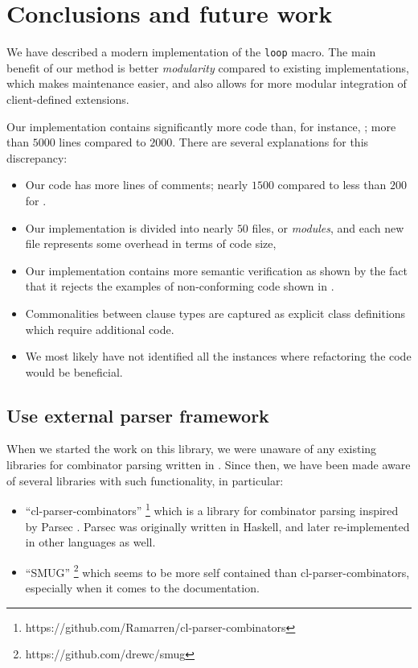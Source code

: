 \section{Conclusions and future work}

We have described a modern implementation of the \commonlisp{}
\texttt{loop} macro.  The main benefit of our method is better
\emph{modularity} compared to existing implementations, which makes
maintenance easier, and also allows for more modular integration of
client-defined extensions.

Our implementation contains significantly more code than, for
instance, \mitloop{}; more than $5000$ lines compared to $2000$.  There
are several explanations for this discrepancy:

\begin{itemize}
\item Our code has more lines of comments; nearly $1500$ compared to
  less than $200$ for \mitloop{}.
\item Our implementation is divided into nearly $50$ files, or
  \emph{modules}, and each new file represents some overhead in terms
  of code size,
\item Our implementation contains more semantic verification as shown
  by the fact that it rejects the examples of non-conforming code shown
  in .
\item Commonalities between clause types are captured as explicit
  class definitions which require additional code.
\item We most likely have not identified all the instances where
  refactoring the code would be beneficial.
\end{itemize}

\subsection{Use external parser framework}

When we started the work on this library, we were unaware of any
existing libraries for combinator parsing written in \commonlisp{}.
Since then, we have been made aware of several libraries with such
functionality, in particular:

\begin{itemize}
\item ``cl-parser-combinators''%
\footnote{https://github.com/Ramarren/cl-parser-combinators} which is
a library for combinator parsing inspired by Parsec
\cite{Leijen:Meijer:Parsec}.  Parsec was originally written in
Haskell, and later re-implemented in other languages as well.
\item ``SMUG''%
\footnote{https://github.com/drewc/smug} which seems to be more
self contained than cl-parser-combinators, especially when it
comes to the documentation.
\end{itemize}

